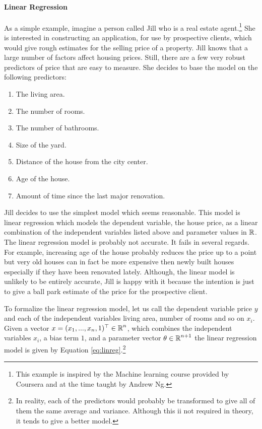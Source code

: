 \paragraph{Linear Regression} As a simple example, imagine a person
called Jill who is a real estate agent.\footnote{This example is
  inspired by the Machine learning course provided by Coursera and at
  the time taught by Andrew Ng.} She is interested in constructing an
application, for use by prospective clients, which would give rough
estimates for the selling price of a property. Jill knows that a large
number of factors affect housing prices. Still, there are a few very
robust predictors of price that are easy to measure.
She decides to base the model on the following predictors:
\begin{enumerate}
\item The living area.
\item The number of rooms.
\item The number of bathrooms.
\item Size of the yard.
\item Distance of the house from the city center.
\item Age of the house.
\item Amount of time since the last major renovation.
\end{enumerate}

Jill decides to use the simplest model which seems reasonable. This
model is linear regression which models the dependent
  variable, the house price, as a linear combination of the independent
variables listed above and parameter values in $\mbox{$\mathbb R$}$. The linear
regression model is probably not accurate. It fails in several
regards. For example, increasing age of the house probably reduces the
price up to a point but very old houses can in fact be more expensive
then newly built houses especially if they have been renovated lately.
Although, the linear model is unlikely to be entirely accurate, Jill is
happy with it because the intention is just to give a ball park
estimate of the price for the prospective client.

To formalize the linear regression model, let us call the dependent
variable price $y$ and each of the independent variables living area,
number of rooms and so on $x_i$. Given a vector $x = (x_1, ...,
x_n, 1)^\top \in \mbox{$\mathbb R$}^n$, which combines the independent
variables $x_i$, a bias term $1$, and a parameter vector $\theta \in
\mbox{$\mathbb R$}^{n+1}$ the linear regression model is given by Equation
\ref{eq:linreg}.\footnote{In reality, each of the predictors would probably
  be transformed to give all of them the same average and
  variance. Although this ii not required in theory, it tends to give
  a better model.}

